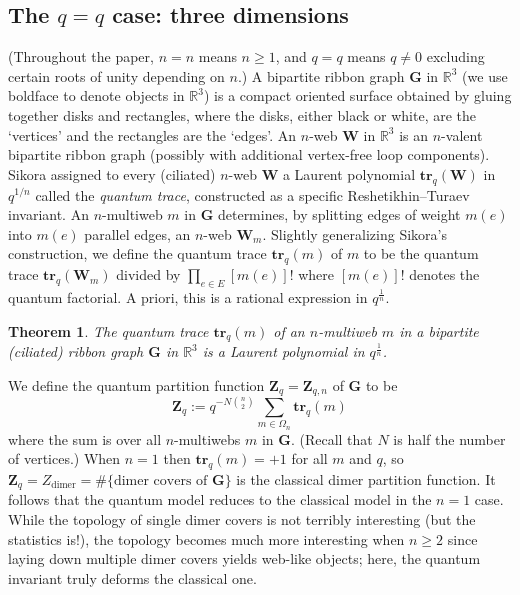 \documentclass[12pt, reqno]{amsart}
\newtheorem{introtheo}{Theorem}
\theoremstyle{definition}
\newcommand{\be}{\begin{equation}}
\newcommand{\ee}{\end{equation}}
\newcommand{\Zq}{\mathbf{Z}_q}%
\newcommand{\R}{\mathbb{R}}%
\newcommand{\trq}{\mathbf{tr}_q}%
\begin{document}
\subsection{The \texorpdfstring{$q=q$}{q=q} case:  three dimensions}

(Throughout the paper, $n=n$ means $n\geq1$, and $q=q$ means $q\neq0$ excluding certain roots of unity depending on $n$.)  A bipartite ribbon graph $\mathbf{G}$ in $\R^3$ (we use boldface to denote objects in $\R^3$) is a compact oriented surface obtained by gluing   together disks and rectangles, where the disks, either black or white, are the `vertices' and the rectangles are the `edges'.    An $n$-web $\mathbf{W}$ in $\R^3$ is an $n$-valent bipartite ribbon graph (possibly with additional vertex-free loop components).    Sikora \cite{sikora2, sikora1} assigned to every (ciliated) $n$-web $\mathbf{W}$ a Laurent polynomial $\trq(\mathbf{W})$   in $q^{1/n}$ called the  \emph{quantum trace}, constructed as a specific Reshetikhin--Turaev invariant.  An $n$-multiweb $m$ in $\mathbf{G}$ determines, by splitting edges of weight $m(e)$ into $m(e)$ parallel edges, an $n$-web $\mathbf{W}_m$.  Slightly generalizing Sikora's construction, we define the quantum trace $\trq(m)$ of $m$ to be the quantum trace $\trq(\mathbf{W}_m)$ divided by $\prod_{e\in E}[m(e)]!$ where $[m(e)]!$ denotes the quantum factorial.  A priori, this is a rational expression in $q^\frac1n$.  

\begin{introtheo}
The quantum trace $\trq(m)$ of an $n$-multiweb $m$ in a bipartite (ciliated) ribbon graph $\mathbf{G}$ in $\R^3$ is a Laurent polynomial in $q^\frac{1}{n}$.
\end{introtheo}

We define the quantum partition function $\Zq=\mathbf{Z}_{q,n}$ of $\mathbf{G}$ to be 
\be\label{Zqdef}
\Zq := q^{-N\binom{n}{2}}\sum_{m\in\Omega_n}\trq(m)
\ee
where the sum is over all $n$-multiwebs $m$ in $\mathbf{G}$.  (Recall that $N$ is half the number of vertices.)  When $n=1$ then $\trq(m)=+1$ for all $m$ and $q$, so $\Zq=Z_\mathrm{dimer}=\#\{\text{dimer covers of }\mathbf{G}\}$ is the classical dimer partition function.  It follows that the quantum model reduces to the classical model in the $n=1$ case.  While the topology of single dimer covers is not terribly interesting (but the statistics is!), the topology becomes much more interesting when $n\geq2$ since laying down multiple dimer covers yields web-like objects; here, the quantum invariant truly deforms the classical one.  
\end{document}
